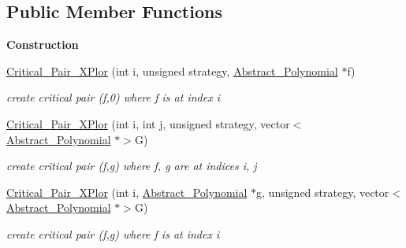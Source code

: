 \subsection*{Public Member Functions}
\begin{Indent}\textbf{ Construction}\par
\begin{DoxyCompactItemize}
\item 
\mbox{\label{class_critical___pair___x_plor_ac1564546db9b4736444a614970c1796d}} 
\hyperlink{class_critical___pair___x_plor_ac1564546db9b4736444a614970c1796d}{Critical\+\_\+\+Pair\+\_\+\+X\+Plor} (int i, unsigned strategy, \hyperlink{class_abstract___polynomial}{Abstract\+\_\+\+Polynomial} $\ast$f)
\begin{DoxyCompactList}\small\item\em create critical pair (f,0) where f is at index {\ttfamily i} \end{DoxyCompactList}\item 
\mbox{\label{class_critical___pair___x_plor_af5d0947e70b4070f796f1b0d8ce75484}} 
\hyperlink{class_critical___pair___x_plor_af5d0947e70b4070f796f1b0d8ce75484}{Critical\+\_\+\+Pair\+\_\+\+X\+Plor} (int i, int j, unsigned strategy, vector$<$ \hyperlink{class_abstract___polynomial}{Abstract\+\_\+\+Polynomial} $\ast$$>$G)
\begin{DoxyCompactList}\small\item\em create critical pair (f,g) where f, g are at indices {\ttfamily i}, {\ttfamily j} \end{DoxyCompactList}\item 
\mbox{\label{class_critical___pair___x_plor_a1cafe8e84ec3bee5e63370b7b815ba71}} 
\hyperlink{class_critical___pair___x_plor_a1cafe8e84ec3bee5e63370b7b815ba71}{Critical\+\_\+\+Pair\+\_\+\+X\+Plor} (int i, \hyperlink{class_abstract___polynomial}{Abstract\+\_\+\+Polynomial} $\ast$g, unsigned strategy, vector$<$ \hyperlink{class_abstract___polynomial}{Abstract\+\_\+\+Polynomial} $\ast$$>$G)
\begin{DoxyCompactList}\small\item\em create critical pair (f,g) where f is at index {\ttfamily i} \end{DoxyCompactList}\item 
\mbox{\label{class_critical___pair___x_plor_ac1564546db9b4736444a614970c1796d}} 

\end{DoxyCompactItemize}
\end{Indent}
